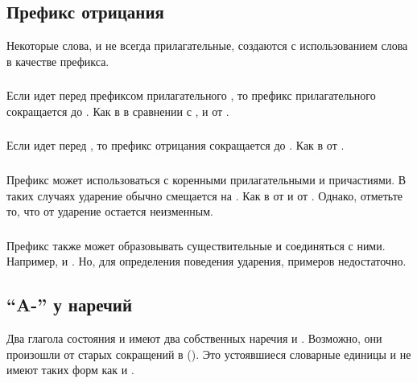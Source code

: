 \subsection{Префикс отрицания} Некоторые слова, и не всегда прилагательные, создаются с использованием слова   в качестве префикса.

\subsubsection{} Если  идет перед префиксом прилагательного
, то префикс прилагательного сокращается до . Как в
  в сравнении с 
, и   от
 .

\subsubsection{} Если  идет перед , то префикс отрицания сокращается до . Как в   от
 .

\subsubsection{} Префикс  может использоваться с коренными прилагательными и причастиями. В таких случаях ударение обычно смещается на .
Как в   от   и
  от  .  Однако,
отметьте то, что   от   ударение остается неизменным.
\label{lingop:prefix:ke}

\subsubsection{} Префикс  также может образовывать существительные и соединяться с ними. Например,   и 
. Но, для определения поведения ударения, примеров недостаточно.


\subsection{``A-'' у наречий} Два глагола состояния  
и   имеют два собственных наречия   и  .  Возможно, они произошли от старых сокращений в  ().  Это устоявшиеся словарные единицы и не имеют таких форм как  и .


